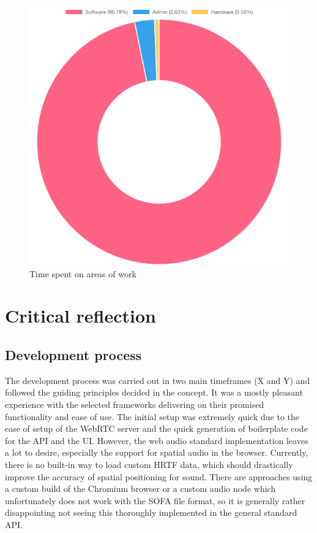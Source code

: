 \begin{figure}[h]
\centering
\includegraphics[scale=0.5]{04_Artefakte/01_Abbildungen/time-spent-on-types-of-work}
\caption[Time spent on areas of work]{Time spent on areas of work\protect}
\label{fig:timeSpentTypeOfWork}
\end{figure}

\section{Critical reflection}

\subsection{Development process}

The development process was carried out in two main timeframes (X and Y) and followed the guiding principles decided in the concept. It was a mostly pleasant experience with the selected frameworks delivering on their promised functionality and ease of use. The initial setup was extremely quick due to the ease of setup of the WebRTC server and the quick generation of boilerplate code for the \ac{API} and the \ac{UI}. However, the web audio standard implementation leaves a lot to desire, especially the support for spatial audio in the browser. Currently, there is no built-in way to load custom \ac{HRTF} data, which should drastically improve the accuracy of spatial positioning for sound. There are approaches using a custom build of the Chromium browser \parencite{chromiumCustomHrtf} or a custom audio node \parencite{customHrtfAudioNode} which unfortunately does not work with the \ac{SOFA} file format, so it is generally rather disappointing not seeing this thoroughly implemented in the general standard \ac{API}.

